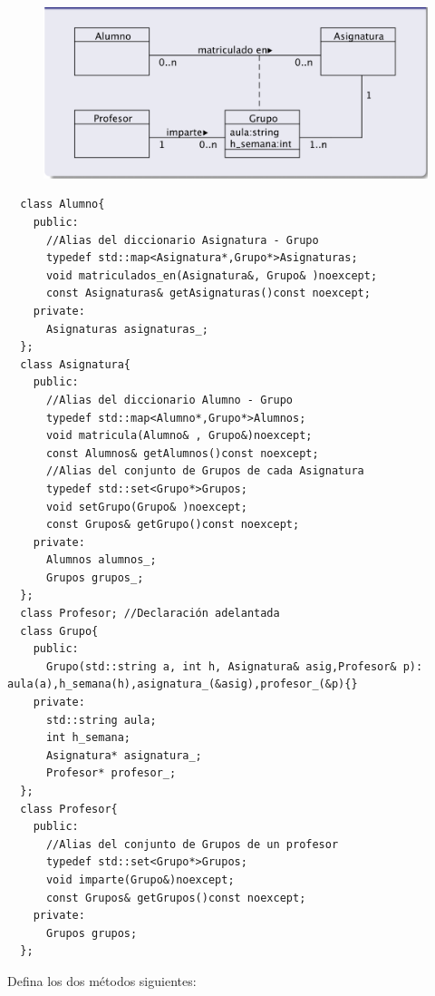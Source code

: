 \begin{figure}[h]
  \begin{center}
    \includegraphics[width=\textwidth]{assets/Seminario3_1_2.png}
  \end{center}
\end{figure}

\begin{verbatim}
  class Alumno{
    public:
      //Alias del diccionario Asignatura - Grupo
      typedef std::map<Asignatura*,Grupo*>Asignaturas;
      void matriculados_en(Asignatura&, Grupo& )noexcept;
      const Asignaturas& getAsignaturas()const noexcept;
    private:
      Asignaturas asignaturas_;
  };
  class Asignatura{
    public:
      //Alias del diccionario Alumno - Grupo
      typedef std::map<Alumno*,Grupo*>Alumnos;
      void matricula(Alumno& , Grupo&)noexcept;
      const Alumnos& getAlumnos()const noexcept;
      //Alias del conjunto de Grupos de cada Asignatura
      typedef std::set<Grupo*>Grupos;
      void setGrupo(Grupo& )noexcept;
      const Grupos& getGrupo()const noexcept;
    private:
      Alumnos alumnos_;
      Grupos grupos_;
  };
  class Profesor; //Declaración adelantada
  class Grupo{
    public:
      Grupo(std::string a, int h, Asignatura& asig,Profesor& p): aula(a),h_semana(h),asignatura_(&asig),profesor_(&p){}
    private:  
      std::string aula;
      int h_semana;
      Asignatura* asignatura_;
      Profesor* profesor_;
  };
  class Profesor{
    public:
      //Alias del conjunto de Grupos de un profesor
      typedef std::set<Grupo*>Grupos;
      void imparte(Grupo&)noexcept;
      const Grupos& getGrupos()const noexcept;
    private:
      Grupos grupos;
  };

\end{verbatim}

 Defina los dos métodos siguientes:

